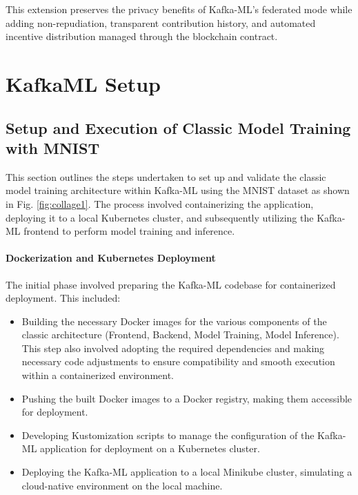 This extension preserves the privacy benefits of Kafka-ML’s federated mode while adding non-repudiation, transparent contribution history, and automated incentive distribution managed through the blockchain contract.

\section{KafkaML Setup}


\subsection{Setup and Execution of Classic Model Training with MNIST}
\label{subsec:classic_mnist_setup}

This section outlines the steps undertaken to set up and validate the classic model training architecture within Kafka-ML using the MNIST dataset as shown in Fig. \ref{fig:collage1}. The process involved containerizing the application, deploying it to a local Kubernetes cluster, and subsequently utilizing the Kafka-ML frontend to perform model training and inference.

\paragraph{Dockerization and Kubernetes Deployment}
The initial phase involved preparing the Kafka-ML codebase for containerized deployment. This included:
\begin{itemize}
    \item Building the necessary Docker images for the various components of the classic architecture (Frontend, Backend, Model Training, Model Inference). This step also involved adopting the required dependencies and making necessary code adjustments to ensure compatibility and smooth execution within a containerized environment.
    \item Pushing the built Docker images to a Docker registry, making them accessible for deployment.
    \item Developing Kustomization scripts to manage the configuration of the Kafka-ML application for deployment on a Kubernetes cluster.
    \item Deploying the Kafka-ML application to a local Minikube cluster, simulating a cloud-native environment on the local machine.
\end{itemize}


